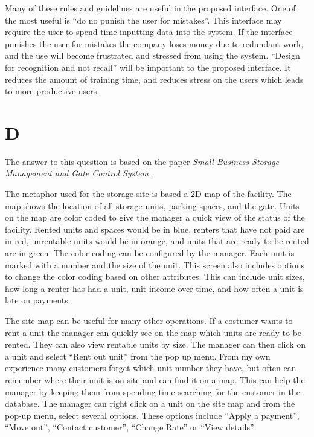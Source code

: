 \documentclass[12pt]{report}
\begin{document}
Many of these rules and guidelines are useful in the proposed interface.  One of the most useful is ``do no punish the user for mistakes''.  This interface may require the user to spend time inputting data into the system.  If the interface punishes the user for mistakes the company loses money due to redundant work, and the use will become frustrated and stressed from using the system.  ``Design for recognition and not recall'' will be important to the proposed interface.  It reduces the amount of training time, and reduces stress on the users which leads to more productive users.


\chapter*{D}

The answer to this question is based on the paper \textit{Small Business Storage Management and Gate Control System.}

The metaphor used for the storage site is based a 2D map of the facility.  The map shows the location of all storage units, parking spaces, and the gate.  Units on the map are color coded to give the manager a quick view of the status of the facility.  Rented units and spaces would be in blue, renters that have not paid are in red, unrentable units would be in orange, and units that are ready to be rented are in green.  The color coding can be configured by the manager.  Each unit is marked with a number and the size of the unit.  This screen also includes options to change the color coding based on other attributes.  This can include unit sizes, how long a renter has had a unit, unit income over time, and how often a unit is late on payments.

The site map can be useful for many other operations.  If a costumer wants to rent a unit the manager can quickly see on the map which units are ready to be rented.  They can also view rentable units by size.  The manager can then click on a unit and select ``Rent out unit'' from the pop up menu.  From my own experience many customers forget which unit number they have, but often can remember where their unit is on site and can find it on a map.  This can help the manager by keeping them from spending time searching for the customer in the database.  The manager can right click on a unit on the site map and from the pop-up menu, select several options.  These options include ``Apply a payment'', ``Move out'', ``Contact customer'', ``Change Rate'' or ``View details''.  
\end{document}
